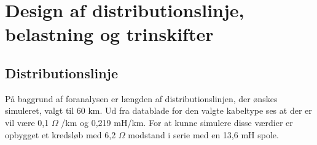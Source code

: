 
\chapter{Design af distributionslinje, belastning og trinskifter}

\section{Distributionslinje}
På baggrund af foranalysen er længden af distributionslinjen, der ønskes simuleret, valgt til 60 km. Ud fra datablade for den valgte kabeltype ses at der er vil være 0,1 $\Omega$ /km og 0,219 mH/km. For at kunne simulere disse værdier er opbygget et kredsløb med 6,2 $\Omega$ modstand i serie med en 13,6 mH spole. 



